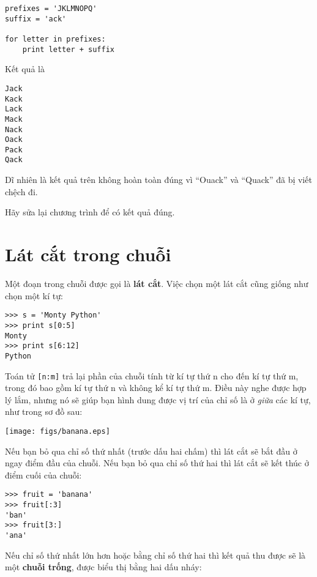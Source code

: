\documentclass[11pt]{book}
\begin{document}
\beforeverb
\begin{verbatim}
prefixes = 'JKLMNOPQ'
suffix = 'ack'

for letter in prefixes:
    print letter + suffix
\end{verbatim}
\afterverb
%
Kết quả là

\beforeverb
\begin{verbatim}
Jack
Kack
Lack
Mack
Nack
Oack
Pack
Qack
\end{verbatim}
\afterverb
%
Dĩ nhiên là kết quả trên không hoàn toàn đúng vì ``Ouack'' và
``Quack'' đã bị viết chệch đi.

\begin{ex}
Hãy sửa lại chương trình để có kết quả đúng.
\end{ex}



\section{Lát cắt trong chuỗi}
\label{lát cắt}


Một đoạn trong chuỗi được gọi là {\bf lát cắt}. Việc chọn một lát cắt cũng
giống như chọn một kí tự:

\beforeverb
\begin{verbatim}
>>> s = 'Monty Python'
>>> print s[0:5]
Monty
>>> print s[6:12]
Python
\end{verbatim}
\afterverb
%
Toán tử {\tt [n:m]} trả lại phần của chuỗi tính từ kí tự thứ n  
cho đến kí tự thứ m, trong đó bao gồm kí tự thứ n và không kể kí tự thứ m.
Điều này nghe được hợp lý lắm, nhưng nó sẽ giúp bạn hình dung được
vị trí của chỉ số là ở {\em giữa} các kí tự, như trong sơ đồ sau:

\beforefig
\centerline{\texttt{[image: figs/banana.eps]}}
\afterfig

Nếu bạn bỏ qua chỉ số thứ nhất (trước dấu hai chấm) thì lát cắt sẽ
bắt đầu ở ngay điểm đầu của chuỗi. Nếu bạn bỏ qua chỉ số thứ hai thì
lát cắt sẽ kết thúc ở điểm cuối của chuỗi:

\beforeverb
\begin{verbatim}
>>> fruit = 'banana'
>>> fruit[:3]
'ban'
>>> fruit[3:]
'ana'
\end{verbatim}
\afterverb
%
Nếu chỉ số thứ nhất lớn hơn hoặc bằng chỉ số thứ hai thì kết quả thu
được sẽ là một {\bf chuỗi trống}, được biểu thị bằng hai dấu nháy:
\end{document}
